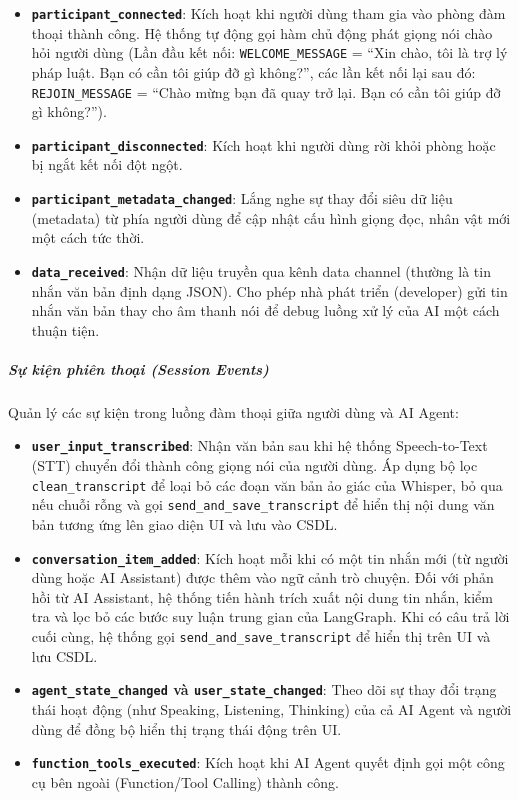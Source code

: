 \begin{itemize}
\item \textbf{\texttt{participant\_connected}}: Kích hoạt khi người dùng tham gia vào phòng đàm thoại thành công. Hệ thống tự động gọi hàm chủ động phát giọng nói chào hỏi người dùng
(Lần đầu kết nối:
\texttt{WELCOME\_MESSAGE} = \enquote{Xin chào, tôi là trợ lý pháp luật. Bạn có cần tôi giúp đỡ gì không?},
các lần kết nối lại sau đó:
\texttt{REJOIN\_MESSAGE} = \enquote{Chào mừng bạn đã quay trở lại. Bạn có cần tôi giúp đỡ gì không?}).

\item \textbf{\texttt{participant\_disconnected}}: Kích hoạt khi người dùng rời khỏi phòng hoặc bị ngắt kết nối đột ngột.

\item \textbf{\texttt{participant\_metadata\_changed}}: Lắng nghe sự thay đổi siêu dữ liệu (metadata) từ phía người dùng để cập nhật cấu hình giọng đọc, nhân vật mới một cách tức thời.

\item \textbf{\texttt{data\_received}}: Nhận dữ liệu truyền qua kênh data channel (thường là tin nhắn văn bản định dạng JSON). Cho phép nhà phát triển (developer) gửi tin nhắn văn bản thay cho âm thanh nói để debug luồng xử lý của AI một cách thuận tiện.
\end{itemize}

\subparagraph{Sự kiện phiên thoại (Session Events)}

Quản lý các sự kiện trong luồng đàm thoại giữa người dùng và AI Agent:

\begin{itemize}
\item \textbf{\texttt{user\_input\_transcribed}}: Nhận văn bản sau khi hệ thống Speech-to-Text (STT) chuyển đổi thành công giọng nói của người dùng. Áp dụng bộ lọc \texttt{clean\_transcript} để loại bỏ các đoạn văn bản ảo giác của Whisper, bỏ qua nếu chuỗi rỗng và gọi \texttt{send\_and\_save\_transcript} để hiển thị nội dung văn bản tương ứng lên giao diện UI và lưu vào CSDL.

\item \textbf{\texttt{conversation\_item\_added}}: Kích hoạt mỗi khi có một tin nhắn mới (từ người dùng hoặc AI Assistant) được thêm vào ngữ cảnh trò chuyện. Đối với phản hồi từ AI Assistant, hệ thống tiến hành trích xuất nội dung tin nhắn, kiểm tra và lọc bỏ các bước suy luận trung gian của LangGraph. Khi có câu trả lời cuối cùng, hệ thống gọi \texttt{send\_and\_save\_transcript} để hiển thị trên UI và lưu CSDL.

\item \textbf{\texttt{agent\_state\_changed} và \texttt{user\_state\_changed}}: Theo dõi sự thay đổi trạng thái hoạt động (như Speaking, Listening, Thinking) của cả AI Agent và người dùng để đồng bộ hiển thị trạng thái động trên UI.

\item \textbf{\texttt{function\_tools\_executed}}: Kích hoạt khi AI Agent quyết định gọi một công cụ bên ngoài (Function/Tool Calling) thành công.
\end{itemize}

